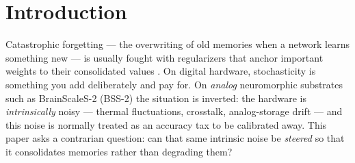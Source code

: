 \documentclass[11pt]{article}
\begin{document}
\begin{abstract}
scores higher but exhibits none of the mechanism. We further \emph{measure} the
intrinsic noise on real BrainScaleS-2 silicon (chip \SiliconChip): it is additive
and trial-to-trial-independent, with a coefficient of variation up to
\SiliconCVMaxPct\ that the chip's \texttt{num\_sends} knob averages as
$\approx1/\sqrt{N}$ --- the benign noise class the mechanism needs, at a reachable
amplitude --- and the inverted-U \SiliconMeasWord\ an emulation calibrated to it.
Finally we run the rule on real BrainScaleS-2 silicon with the chip in the training
loop: its own intrinsic noise, steered by the barrier-conditioning, retains a prior
task \SilTrainRetGainPts\ points better than the matched unconditioned control at
matched average accuracy --- a stability-plasticity shift, not a net-accuracy win
(single seed, one operating point; retention measured, energy modelled). Within these
limits the mechanism reframes analog noise from a tax into a consolidation dividend
that a von-Neumann accelerator must spend energy to \emph{generate}.
\end{abstract}

\section{Introduction}

Catastrophic forgetting --- the overwriting of old memories when a network learns
something new --- is usually fought with regularizers that anchor important weights
to their consolidated values \citep{ewc2017,bennafusi2016}. On digital hardware,
stochasticity is something you add deliberately and pay for. On \emph{analog}
neuromorphic substrates such as BrainScaleS-2 (BSS-2) the situation is inverted:
the hardware is \emph{intrinsically} noisy --- thermal fluctuations, crosstalk,
analog-storage drift \citep{weis2020,pehle2022} --- and this noise is normally
treated as an accuracy tax to be calibrated away. This paper asks a contrarian
question: can that same intrinsic noise be \emph{steered} so that it consolidates
memories rather than degrading them?
\end{document}
